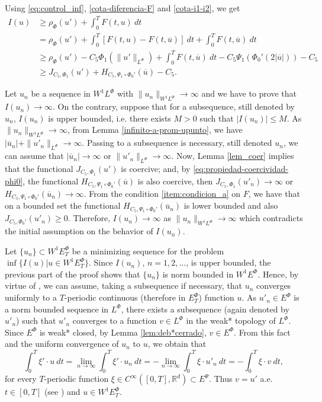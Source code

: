 \documentclass[twoside]{article}
\theoremstyle{remark}
\newcommand{\orlnor}{\|_{L^{\Phi}}}
\newcommand{\lphi}{L^{\Phi}}
\newcommand{\ephi}{E^{\Phi}}
\newcommand{\wphi}{W^{1}\lphi}
\newcommand{\wphiet}{W^{1}\ephi_T}
\newcommand{\wphie}{W^{1}\ephi}
\newcommand{\sobnor}{\|_{W^{1}\lphi}}
\newcommand{\rr}{\mathbb{R}}
\renewcommand{\leq}{\leqslant}
\renewcommand{\geq}{\geqslant}
\newcommand{\epsi}{E^{\Psi}}
\begin{document}
Using  \eqref{eq:control_inf},  \eqref{cota-diferencia-F} and
\eqref{cota-i1-i2}, we get
\begin{equation}\label{cota_inf_I}
\begin{split}
I(u)&
\geq\rho_{\Phi}(u')+\int_0^TF(t,u)\ dt
\\ 
&=\rho_{\Phi}( u')+ \int_0^T \left[F(t,u)-F(t,\overline{u})\right]\ dt
+  \int_0^TF(t,\overline{u})\ dt
\\
&\geq \rho_{\Phi}( u')
-C_5 \Phi_1(\|u'\orlnor)
+\int_0^TF(t,\overline{u})\ dt-
C_5 \Psi_1(\Phi_0'(2|\overline{u}|))-
C_5
\\
&\geq 
J_{C_5,\Phi_1}(u')
+H_{C_5, \Psi_1\circ\Phi_0'}(\overline{u})
-C_5.
\end{split}
\end{equation}



Let $u_n$ be  a sequence in $\wphi$ with
$\|u_n\sobnor\to\infty$ and we have to prove that $I(u_n)\to\infty$.
On the contrary, suppose  that for a subsequence,
still denoted by $u_n$, $I(u_n)$ is upper bounded, i.e. there exists $M>0$ such that $|I(u_{n})|\leq M$.
As $\|u_n\sobnor\to\infty$, from Lemma \ref{infinito-a-prom-upunto},  we have $|\overline{u}_n|+\|u'_n\orlnor\to \infty$. Passing to a subsequence is necessary, still denoted $u_n$, we can assume that $|\overline{u}_n|\to \infty$ or $\|u'_n\orlnor\to \infty$.
Now, Lemma \ref{lem_coer} implies that the functional $J_{C_5,\Phi_1}(u')$ is coercive;
and, by \eqref{eq:propiedad-coercividad-phi0},
the functional $H_{C_5,\Psi_1\circ\Phi_0'}(\overline{u})$ is also coercive, then
$J_{C_5,\Phi_1}(u'_n) \to \infty$ or $H_{C_5,\Psi_1\circ\Phi_0'}(\overline{u}_n)\to \infty$.
From the condition \eqref{item:condicion_a}  on $F$, we have that on a bounded set the functional $H_{C_5,\Psi_1\circ\Phi_0'}(\overline{u}_n)$ is lower bounded and
also $J_{C_5,\Phi_0'}(u'_n)\geq 0$.
Therefore,  $I(u_n)\to\infty$ as $\|u_n\sobnor\to\infty$ which contradicts the initial assumption on the behavior of $I(u_n)$.

Let $\{u_n\}\subset \wphiet$  be a  minimizing sequence for the problem  $\inf\{I(u)|u\in\wphiet\}$.
Since  $I(u_n)$, $n=1,2,\ldots$,  is upper bounded, the previous part of the proof shows that $\{u_n\}$ is norm bounded in $\wphie$. Hence, by virtue of  \cite[Cor. 2.2]{ABGMS2015}, we can assume, taking a subsequence if necessary, that $u_n$ converges uniformly to a $T$-periodic continuous (therefore in $\ephi_T$)  function $u$. As $u'_n \in \ephi$ is a norm bounded sequence in $\lphi$,
there exists a subsequence (again denoted by $u'_n$) such that $u'_n$ converges to a function $v\in\lphi$ in the weak* topology of $\lphi$.
Since $\ephi$ is weak* closed, by Lemma \ref{lem:deb*cerrado}, $v\in \ephi$. From this fact and the uniform convergence of $u_n$ to $u$, we obtain that
\[
\int_0^T\xi'\cdot u\ dt=\lim_{n\to\infty}\int_0^T\xi'\cdot u_n \ dt=
-\lim_{n\to\infty}\int_0^T\xi\cdot u'_n\ dt=-\int_0^T\xi\cdot v\ dt,
\]
for every $T$-periodic function $\xi\in C^{\infty}([0,T],\rr^d)\subset\epsi$.
Thus $v=u'$ a.e. $t\in [0,T]$ (see \cite[p. 6]{mawhin2010critical}) and $u\in\wphiet$.
\end{document}
